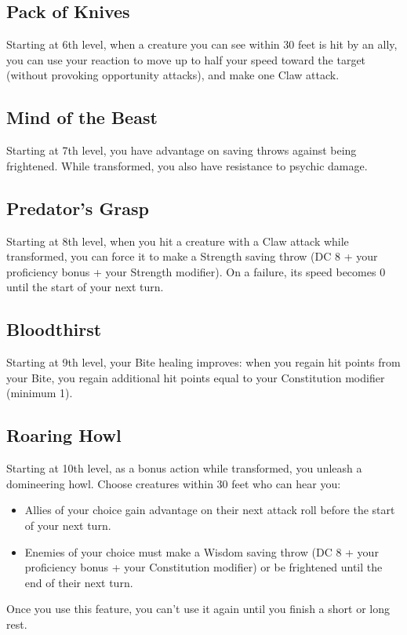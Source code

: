 \subsection*{Pack of Knives}
Starting at 6th level, when a creature you can see within 30 feet is hit by an ally, you can use your reaction to move up to half your speed toward the target (without provoking opportunity attacks), and make one Claw attack.

\subsection*{Mind of the Beast}
Starting at 7th level, you have advantage on saving throws against being frightened. While transformed, you also have resistance to psychic damage.

\subsection*{Predator's Grasp}
Starting at 8th level, when you hit a creature with a Claw attack while transformed, you can force it to make a Strength saving throw (DC 8 + your proficiency bonus + your Strength modifier). On a failure, its speed becomes 0 until the start of your next turn.

\subsection*{Bloodthirst}
Starting at 9th level, your Bite healing improves: when you regain hit points from your Bite, you regain additional hit points equal to your Constitution modifier (minimum 1).

\subsection*{Roaring Howl}
Starting at 10th level, as a bonus action while transformed, you unleash a domineering howl. Choose creatures within 30 feet who can hear you:
\begin{itemize}
\item Allies of your choice gain advantage on their next attack roll before the start of your next turn.
\item Enemies of your choice must make a Wisdom saving throw (DC 8 + your proficiency bonus + your Constitution modifier) or be frightened until the end of their next turn.
\end{itemize}
Once you use this feature, you can't use it again until you finish a short or long rest.

